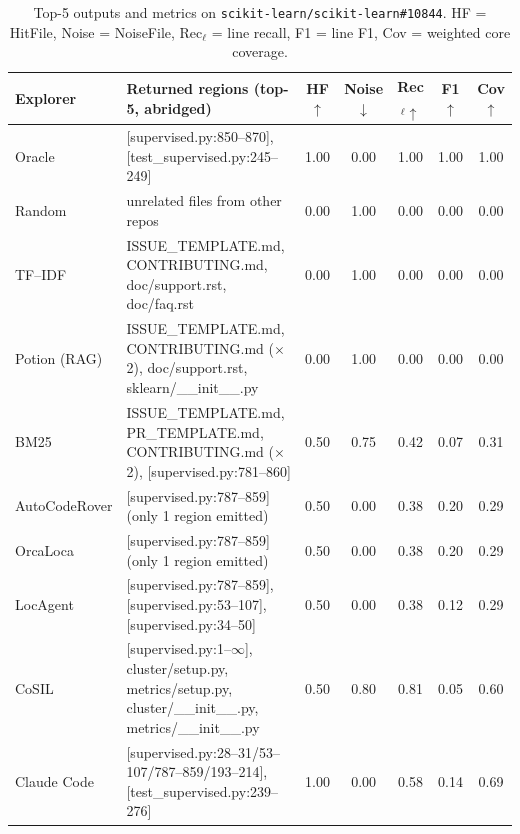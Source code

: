 \begin{table}[h]
\centering
\small
\setlength{\tabcolsep}{4pt}
\caption{Top-5 outputs and metrics on \texttt{scikit-learn/scikit-learn\#10844}.
HF = HitFile, Noise = NoiseFile, Rec$_\ell$ = line recall, F1 = line F1, Cov = weighted core coverage.}
\label{tab:case-sklearn}
\begin{tabular}{l p{6.6cm} ccccc}
\toprule
Explorer & Returned regions (top-5, abridged) & HF$\uparrow$ & Noise$\downarrow$ & Rec$_\ell\uparrow$ & F1$\uparrow$ & Cov$\uparrow$ \\
\midrule
Oracle         & [supervised.py:850--870], [test\_supervised.py:245--249]                                                                       & 1.00 & 0.00 & 1.00 & 1.00 & 1.00 \\
\midrule
Random         & unrelated files from other repos                                                                                              & 0.00 & 1.00 & 0.00 & 0.00 & 0.00 \\
TF--IDF        & ISSUE\_TEMPLATE.md, CONTRIBUTING.md, doc/support.rst, doc/faq.rst                                                              & 0.00 & 1.00 & 0.00 & 0.00 & 0.00 \\
Potion (RAG)   & ISSUE\_TEMPLATE.md, CONTRIBUTING.md ($\times$2), doc/support.rst, sklearn/\_\_init\_\_.py                                       & 0.00 & 1.00 & 0.00 & 0.00 & 0.00 \\
BM25           & ISSUE\_TEMPLATE.md, PR\_TEMPLATE.md, CONTRIBUTING.md ($\times$2), [supervised.py:781--860]                                     & 0.50 & 0.75 & 0.42 & 0.07 & 0.31 \\
\midrule
AutoCodeRover  & [supervised.py:787--859]  (only 1 region emitted)                                                                              & 0.50 & 0.00 & 0.38 & 0.20 & 0.29 \\
OrcaLoca       & [supervised.py:787--859]  (only 1 region emitted)                                                                              & 0.50 & 0.00 & 0.38 & 0.20 & 0.29 \\
LocAgent       & [supervised.py:787--859], [supervised.py:53--107], [supervised.py:34--50]                                                      & 0.50 & 0.00 & 0.38 & 0.12 & 0.29 \\
CoSIL          & [supervised.py:1--$\infty$], cluster/setup.py, metrics/setup.py, cluster/\_\_init\_\_.py, metrics/\_\_init\_\_.py             & 0.50 & 0.80 & 0.81 & 0.05 & 0.60 \\
Claude Code    & [supervised.py:28--31/53--107/787--859/193--214], [test\_supervised.py:239--276]                                               & 1.00 & 0.00 & 0.58 & 0.14 & 0.69 \\

\end{tabular}
\end{table}
